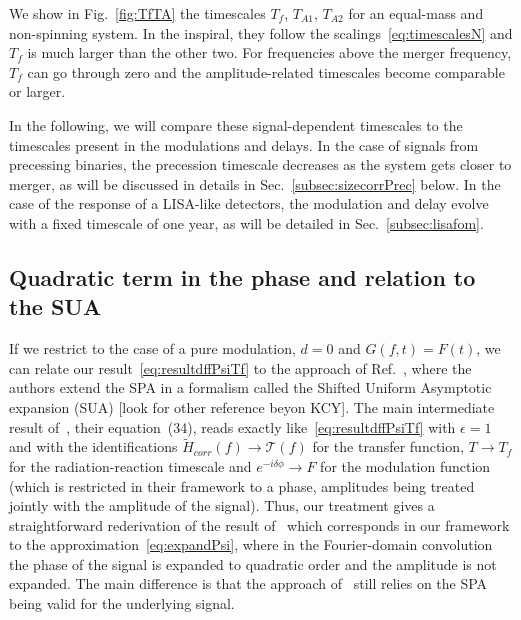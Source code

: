 \documentclass[aps,showpacs,twocolumn,
prd,superscriptaddress,nofootinbib]{revtex4-1}
\newcommand\calT{{\mathcal{T}}}
\newcommand{\Tf}{T_{f}}
\newcommand{\SM}[1]{{\color{Red} #1}}
\begin{document}
We show in Fig.~\ref{fig:TfTA} the timescales $\Tf$, $T_{A1}$, $T_{A2}$ for an equal-mass and non-spinning system. In the inspiral, they follow the scalings~\eqref{eq:timescalesN} and $\Tf$ is much larger than the other two. For frequencies above the merger frequency, $\Tf$ can go through zero and the amplitude-related timescales become comparable or larger.

In the following, we will compare these signal-dependent timescales to the timescales present in the modulations and delays. In the case of signals from precessing binaries, the precession timescale decreases as the system gets closer to merger, as will be discussed in details in Sec.~\ref{subsec:sizecorrPrec} below. In the case of the response of a LISA-like detectors, the modulation and delay evolve with a fixed timescale of one year, as will be detailed in Sec.~\ref{subsec:lisafom}.


\subsection{Quadratic term in the phase and relation to the SUA}
\label{subsec:resumquadphase}

If we restrict to the case of a pure modulation, $d=0$ and $G(f,t) = F(t)$, we can relate our result~\eqref{eq:resultdffPsiTf} to the approach of Ref.~\cite{KCY14}, where the authors extend the SPA in a formalism called the Shifted Uniform Asymptotic expansion (SUA) \SM{[look for other reference beyon KCY]}.
The main intermediate result of~\cite{KCY14}, their equation~(34), reads exactly like~\eqref{eq:resultdffPsiTf} with $\epsilon=1$ and with the identifications $\tilde{H}_{corr}(f)\rightarrow \calT(f)$ for the transfer function, $T\rightarrow \Tf$ for the radiation-reaction timescale and $e^{-i\delta\phi} \rightarrow F$ for the modulation function (which is restricted in their framework to a phase, amplitudes being treated jointly with the amplitude of the signal). Thus, our treatment gives a straightforward rederivation of the result of~\cite{KCY14} which corresponds in our framework to the approximation~\eqref{eq:expandPsi}, where in the Fourier-domain convolution the phase of the signal is expanded to quadratic order and the amplitude is not expanded. The main difference is that the approach of~\cite{KCY14} still relies on the SPA being valid for the underlying signal.
\end{document}
